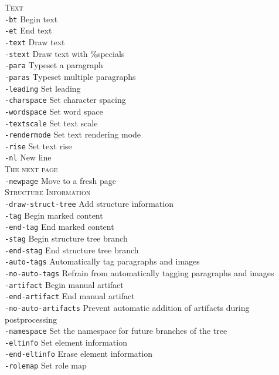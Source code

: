 \documentclass{book}
\begin{document}
{\begin{framed}
   \vspace{1.5mm}
   \noindent \textsc{Text}\\
   \noindent\verb!-bt! Begin text\\
   \noindent\verb!-et! End text\\
   \noindent\verb!-text! Draw text\\
   \noindent\verb!-stext! Draw text with \%specials\\
   \noindent\verb!-para! Typeset a paragraph\\
   \noindent\verb!-paras! Typeset multiple paragraphs\\
   \noindent\verb!-leading! Set leading\\
   \noindent\verb!-charspace! Set character spacing\\
   \noindent\verb!-wordspace! Set word space\\
   \noindent\verb!-textscale! Set text scale\\
   \noindent\verb!-rendermode! Set text rendering mode\\
   \noindent\verb!-rise! Set text rise\\
   \noindent\verb!-nl! New line\\

   \vspace{1.5mm}
   \noindent \textsc{The next page}\\
   \noindent\verb!-newpage! Move to a fresh page\\

   \vspace{1.5mm}
   \noindent \textsc{Structure Information}\\
   \noindent\verb!-draw-struct-tree! Add structure information\\
   \noindent\verb!-tag! Begin marked content\\
   \noindent\verb!-end-tag! End marked content\\
   \noindent\verb!-stag! Begin structure tree branch\\
   \noindent\verb!-end-stag! End structure tree branch\\
   \noindent\verb!-auto-tags! Automatically tag paragraphs and images\\
   \noindent\verb!-no-auto-tags! Refrain from automatically tagging paragraphs and images\\
   \noindent\verb!-artifact! Begin manual artifact\\
   \noindent\verb!-end-artifact! End manual artifact\\
   \noindent\verb!-no-auto-artifacts! Prevent automatic addition of artifacts during postprocessing\\
   \noindent\verb!-namespace! Set the namespace for future branches of the tree\\
   \noindent\verb!-eltinfo! Set element information\\
   \noindent\verb!-end-eltinfo! Erase element information\\
   \noindent\verb!-rolemap! Set role map
  \end{framed}}
\end{document}
